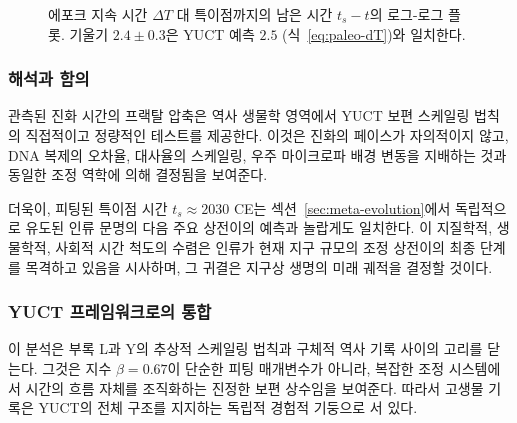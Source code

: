 \documentclass[12pt,a4paper]{article}
\theoremstyle{remark}
\begin{document}
	\begin{figure}[htbp]
		\centering
		\caption{에포크 지속 시간 \(\Delta T\) 대 특이점까지의 남은 시간 \(t_s - t\)의 로그-로그 플롯. 기울기 \(2.4 \pm 0.3\)은 YUCT 예측 \(2.5\) (식~\eqref{eq:paleo-dT})와 일치한다.}
		\label{fig:paleo-scaling}
	\end{figure}
	
	\subsubsection{해석과 함의}
	
	관측된 진화 시간의 프랙탈 압축은 역사 생물학 영역에서 YUCT 보편 스케일링 법칙의 직접적이고 정량적인 테스트를 제공한다. 이것은 진화의 페이스가 자의적이지 않고, DNA 복제의 오차율, 대사율의 스케일링, 우주 마이크로파 배경 변동을 지배하는 것과 동일한 조정 역학에 의해 결정됨을 보여준다.
	
	더욱이, 피팅된 특이점 시간 \(t_s \approx 2030\) CE는 섹션~\ref{sec:meta-evolution}에서 독립적으로 유도된 인류 문명의 다음 주요 상전이의 예측과 놀랍게도 일치한다. 이 지질학적, 생물학적, 사회적 시간 척도의 수렴은 인류가 현재 지구 규모의 조정 상전이의 최종 단계를 목격하고 있음을 시사하며, 그 귀결은 지구상 생명의 미래 궤적을 결정할 것이다.
	
	\subsubsection{YUCT 프레임워크로의 통합}
	
	이 분석은 부록 L과 Y의 추상적 스케일링 법칙과 구체적 역사 기록 사이의 고리를 닫는다. 그것은 지수 \(\beta = 0.67\)이 단순한 피팅 매개변수가 아니라, 복잡한 조정 시스템에서 시간의 흐름 자체를 조직화하는 진정한 보편 상수임을 보여준다. 따라서 고생물 기록은 YUCT의 전체 구조를 지지하는 독립적 경험적 기둥으로 서 있다.
	
\end{document}
